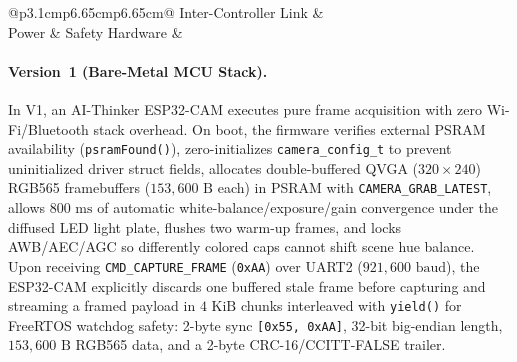 \documentclass[10pt,twocolumn,letterpaper]{article}
\begin{document}
\begin{table}[t]
\begin{tabular}{@{}p{3.1cm}p{6.65cm}p{6.65cm}@{}}
    Inter-Controller Link &  \\
    Power \& Safety Hardware &  \\
    \bottomrule
  \end{tabular}
  \caption{Comprehensive hardware and algorithmic comparison between CapSorter V1 (bare-metal dual-MCU) and V2 (consolidated edge SBC), highlighting the strictly shared real-time motion, wire protocol, and electrical safety layer.}
  \label{tab:hardware_comparison}
\end{table}

\paragraph{Version~1 (Bare-Metal MCU Stack).}
In V1, an AI-Thinker ESP32-CAM executes pure frame acquisition with zero Wi-Fi/Bluetooth stack overhead. On boot, the firmware verifies external PSRAM availability (\texttt{psramFound()}), zero-initializes \texttt{camera\_config\_t} to prevent uninitialized driver struct fields, allocates double-buffered QVGA ($320\times 240$) RGB565 framebuffers ($153{,}600\text{ B}$ each) in PSRAM with \texttt{CAMERA\_GRAB\_LATEST}, allows $800\text{ ms}$ of automatic white-balance/exposure/gain convergence under the diffused LED light plate, flushes two warm-up frames, and locks AWB/AEC/AGC so differently colored caps cannot shift scene hue balance. Upon receiving \texttt{CMD\_CAPTURE\_FRAME} (\texttt{0xAA}) over UART2 ($921{,}600\text{ baud}$), the ESP32-CAM explicitly discards one buffered stale frame before capturing and streaming a framed payload in $4\text{ KiB}$ chunks interleaved with \texttt{yield()} for FreeRTOS watchdog safety: 2-byte sync \texttt{[0x55, 0xAA]}, 32-bit big-endian length, $153{,}600\text{ B}$ RGB565 data, and a 2-byte CRC-16/CCITT-FALSE trailer.
\end{document}
